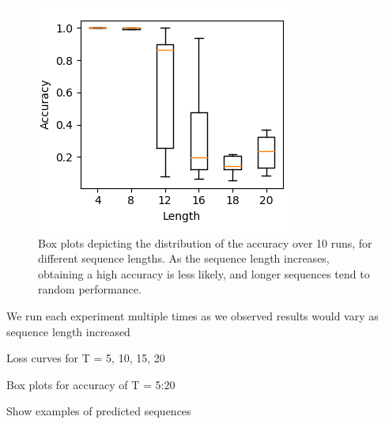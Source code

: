 \documentclass{article}
\begin{document}
\begin{figure}[t]
\centering
\includegraphics[scale=0.7]{img/rnn-acc-Lbox}
 \caption{Box plots depicting the distribution of the accuracy over 10 runs, for different sequence lengths. As the sequence length increases, obtaining a high accuracy is less likely, and longer sequences tend to random performance.}
\label{fig:rnn_acc_box}
\end{figure}



We run each experiment multiple times as we observed results would vary as sequence length increased

Loss curves for T = 5, 10, 15, 20

Box plots for accuracy of T = 5:20

Show examples of predicted sequences



\end{document}
